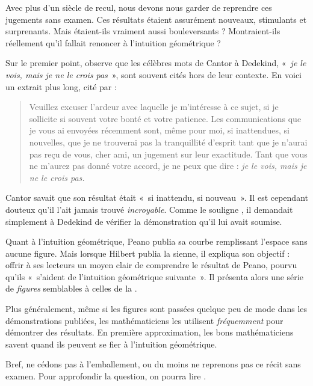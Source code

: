 \documentclass[../../../include/open-logic-section]{subfiles}
\begin{document}


Avec plus d'un siècle de recul, nous devons nous garder de reprendre
ces jugements sans examen. Ces résultats étaient assurément nouveaux,
stimulants et surprenants. Mais étaient-ils vraiment aussi
bouleversants ? Montraient-ils réellement qu'il fallait renoncer à
l'intuition géométrique ?

Sur le premier point, \citet{Gouvea2011} observe que les célèbres
mots de Cantor à Dedekind, «~\emph{je le vois, mais je ne le crois
pas}~», sont souvent cités hors de leur contexte. En voici un
extrait plus long, cité par \citeauthor{Gouvea2011} :
\begin{quote}
Veuillez excuser l'ardeur avec laquelle je m'intéresse à ce sujet,
si je sollicite si souvent votre bonté et votre patience. Les
communications que je vous ai envoyées récemment sont, même pour
moi, si inattendues, si nouvelles, que je ne trouverai pas la
tranquillité d'esprit tant que je n'aurai pas reçu de vous, cher ami,
un jugement sur leur exactitude. Tant que vous ne m'aurez pas donné votre
accord, je ne peux que dire : \emph{je le vois, mais je ne le crois
pas.}
\end{quote}
Cantor savait que son résultat était «~si inattendu, si nouveau~».
Il est cependant douteux qu'il l'ait jamais trouvé
\emph{incroyable}. Comme le souligne \citeauthor{Gouvea2011}, il
demandait simplement à Dedekind de vérifier la démonstration qu'il
lui avait soumise.

Quant à l'intuition géométrique, Peano publia sa courbe remplissant
l'espace sans aucune figure. Mais lorsque Hilbert publia la sienne,
il expliqua son objectif : offrir à ses lecteurs un moyen clair de
comprendre le résultat de Peano, pourvu qu'ils «~s'aident de
l'intuition géométrique suivante~». Il présenta alors une série de
\emph{figures} semblables à celles de la
.

Plus généralement, même si les figures sont passées quelque peu de
mode dans les démonstrations publiées, les mathématiciens les
utilisent \emph{fréquemment} pour démontrer des résultats. En
première approximation, les bons mathématiciens savent quand ils
peuvent se fier à l'intuition géométrique.

Bref, ne cédons pas à l'emballement, ou du moins ne reprenons pas
ce récit sans examen. Pour approfondir la question,
on pourra lire \citet{Giaquinto2007}.
\end{document}
